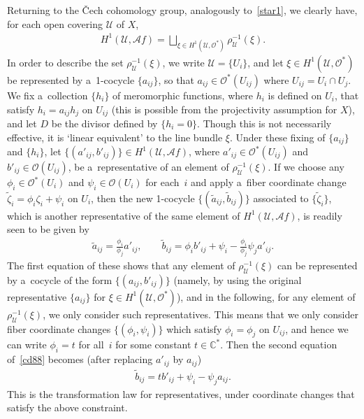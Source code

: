 Returning to the \v Cech cohomology group, analogously to~\eqref{star1}, we clearly have, for each open covering
$\mathscr U$ of $X$,
\begin{gather*}%
H^1 (\mathscr U,\mathscr Af) = \bigsqcup_{\xi \in H^1(\mathscr U,\mathscr O^*)}\rho_{\mathscr U}^{-1}(\xi).
\end{gather*}
In order to describe the set $\rho_{\mathscr U}^{-1}(\xi)$, we write $\mathscr U = \{U_i\}$, and let $\xi\in
H^1(\mathscr U,\mathscr O^*)$ be represented by a~1-cocycle $\{a_{ij}\}$, so that $a_{ij}\in \mathscr O^*(U_{ij})$ where
$U_{ij}=U_i\cap U_j$.
We f\/ix a~collection $\{h_i\}$ of meromorphic functions, where $h_i$ is def\/ined on $U_i$, that satisfy $h_i = a_{ij}
h_j$ on $U_{ij}$ (this is possible from the projectivity assumption for $X$), and let $D$ be the divisor def\/ined by
$\{h_i = 0\}$.
Though this is not necessarily ef\/fective, it is `linear equivalent' to the line bundle $\xi$.
Under these f\/ixing of $\{a_{ij}\}$ and $\{h_i\}$, let $\{(a'_{ij},b'_{ij})\}\in H^1(\mathscr U,\mathscr Af)$, where
$a'_{ij}\in\mathscr O^*(U_{ij})$ and $b'_{ij}\in \mathscr O(U_{ij})$, be a~representative of an element of
$\rho_{\mathscr U}^{-1}(\xi)$.
If we choose any $\phi_i\in \mathscr O^*(U_i)$ and $\psi_i\in \mathscr O(U_i)$ for each~$i$ and apply a~f\/iber
coordinate change $\tilde{\zeta}_i= \phi_i\zeta_i + \psi_i$ on $U_i$, then the new 1-cocycle $\{(\tilde a_{ij},\tilde
b_{ij})\}$ associated to $\{\tilde{\zeta}_i\}$, which is another representative of the same element of $H^1(\mathscr
U,\mathscr Af)$, is readily seen to be given by
\begin{gather}
\label{cd88}
\tilde a_{ij} = \frac{\phi_i}{\phi_j}a'_{ij},
\qquad
\tilde b_{ij} = \phi_i b'_{ij} + \psi_i - \frac{\phi_i}{\phi_j}\psi_j a'_{ij}.
\end{gather}
The f\/irst equation of these shows that any element of $\rho_{\mathscr U}^{-1} (\xi)$ can be represented by a~cocycle
of the form $\{(a_{ij},b'_{ij})\}$ (namely, by using the original representative $\{a_{ij}\}$ for $\xi\in H^1(\mathscr
U,\mathscr O^*)$), and in the following, for any element of $\rho_{\mathscr U}^{-1} (\xi)$, we only consider such
representatives.
This means that we only consider f\/iber coordinate changes $\{(\phi_i,\psi_i)\}$ which satisfy $\phi_i = \phi_j$ on
$U_{ij}$, and hence we can write $\phi_i = t$ for all~$i$ for some constant $t\in \mathbb{C}^*$.
Then the second equation of~\eqref{cd88} becomes (after replacing $a'_{ij}$ by $a_{ij}$)
\begin{gather}
\label{cc89}
\tilde b_{ij} = t b'_{ij} + \psi_i -\psi_j a_{ij}.
\end{gather}
This is the transformation law for representatives, under coordinate changes that satisfy the above constraint.

